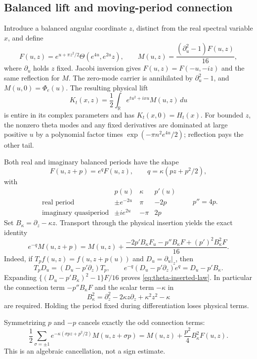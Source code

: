 \documentclass[11pt]{article}
\numberwithin{equation}{section}
\theoremstyle{definition}
\theoremstyle{remark}
\begin{document}
\subsection{Balanced lift and moving-period connection}
\label{sec:theta-moving-period}

Introduce a balanced angular coordinate $z$, distinct from the real
spectral variable $x$, and define
\begin{equation}
 F(u,z)=e^{u+\pi z^2/2}\Theta(e^{4u},e^{2u}z),\qquad
 M(u,z)=\frac{(\partial_u^2-1)F(u,z)}{16},
 \label{eq:theta-balanced-insertion}
\end{equation}
where $\partial_u$ holds $z$ fixed.  Jacobi inversion gives
$F(u,z)=F(-u,-iz)$ and the same reflection for $M$.  The zero-mode
carrier is annihilated by $\partial_u^2-1$, and
$M(u,0)=\Phi_e(u)$.  The resulting physical lift
\[
 K_t(x,z)=\frac12\int_{\mathbb R}e^{tu^2+ixu}M(u,z)\,du
\]
is entire in its complex parameters and has $K_t(x,0)=H_t(x)$.
For bounded $z$, the nonzero theta modes and any fixed derivatives
are dominated at large positive $u$ by a polynomial factor times
$\exp(-\pi n^2e^{4u}/2)$; reflection pays the other tail.

Both real and imaginary balanced periods have the shape
\[
 F(u,z+p)=e^qF(u,z),\qquad
 q=\kappa(pz+p^2/2),
\]
with
\[
 \begin{array}{c|c|c|c}
 &p(u)&\kappa&p'(u)\\ \hline
 \text{real period}&\pm e^{-2u}&\pi&-2p\\
 \text{imaginary quasiperiod}&\pm i e^{2u}&-\pi&2p
 \end{array}
 \qquad p''=4p.
\]
Set $B_\kappa=\partial_z-\kappa z$.  Transport through the physical
insertion yields the exact identity
\begin{equation}
 e^{-q}M(u,z+p)
 =M(u,z)+\frac{-2p'B_\kappa F_u-p''B_\kappa F
                          +(p')^2B_\kappa^2F}{16}.
 \label{eq:theta-inserted-law}
\end{equation}
Indeed, if $T_pf(u,z)=f(u,z+p(u))$ and
$D_u=\partial_u|_z$, then
\[
 T_pD_u=(D_u-p'\partial_z)T_p,\qquad
 e^{-q}(D_u-p'\partial_z)e^q=D_u-p'B_\kappa.
\]
Expanding $\{(D_u-p'B_\kappa)^2-1\}F/16$ proves
\eqref{eq:theta-inserted-law}.  In particular the connection term
$-p''B_\kappa F$ and the scalar term $-\kappa$ in
\[
 B_\kappa^2=\partial_z^2-2\kappa z\partial_z
                      +\kappa^2z^2-\kappa
\]
are required.  Holding the period fixed during differentiation loses
physical terms.

Symmetrizing $p$ and $-p$ cancels exactly the odd connection terms:
\begin{equation}
 \frac12\sum_{\sigma=\pm1}
    e^{-\kappa(\sigma pz+p^2/2)}M(u,z+\sigma p)
       =M(u,z)+\frac{p^2}{4}B_\kappa^2F(u,z).
 \label{eq:theta-symmetric-law}
\end{equation}
This is an algebraic cancellation, not a sign estimate.
\end{document}
